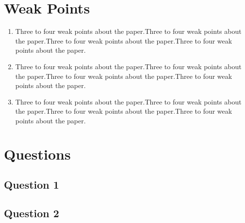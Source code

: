 \documentclass[conference]{IEEEtran}
\begin{document}
\section{Weak Points}
\begin{enumerate}
\item Three to four weak points about the paper.Three to four weak points about the paper.Three to four weak points about the paper.Three to four weak points about the paper.
\item Three to four weak points about the paper.Three to four weak points about the paper.Three to four weak points about the paper.Three to four weak points about the paper.
\item Three to four weak points about the paper.Three to four weak points about the paper.Three to four weak points about the paper.Three to four weak points about the paper.
\end{enumerate}



\section{Questions}

\subsection{Question 1}

\lipsum[2]


\subsection{Question 2}
\lipsum[2]











\end{document}
